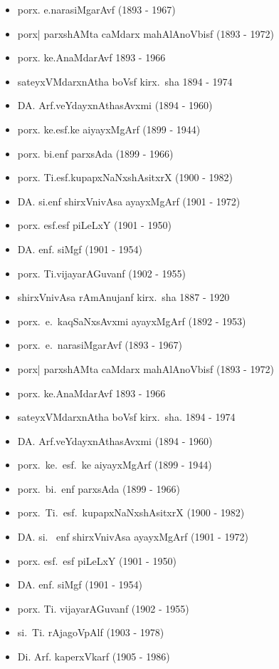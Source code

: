 {\begin{itemize}
\item porx. e.narasiMgarAvf {\rm (1893 - 1967)}
\item porx| parxshAMta caMdarx mahAlAnoVbisf {\rm (1893 - 1972)}
\item porx. ke.AnaMdarAvf {\rm 1893 - 1966}
\item sateyxVMdarxnAtha boVsf kirx.~sha {\rm 1894 - 1974}
\item DA. Arf.veYdayxnAthasAvxmi {\rm (1894 - 1960)}
\item porx. ke.esf.ke aiyayxMgArf {\rm (1899 - 1944)}
\item porx. bi.enf parxsAda {\rm (1899 - 1966)}
\item porx. Ti.esf.kupapxNaNxshAsitxrX {\rm (1900 - 1982)}
\item DA. si.enf shirxVnivAsa ayayxMgArf {\rm (1901 - 1972)}
\item porx. esf.esf piLeLxY {\rm (1901 - 1950)}
\item DA. enf. siMgf {\rm (1901 - 1954)}
\item porx. Ti.vijayarAGuvanf {\rm (1902 - 1955)}
\item shirxVnivAsa rAmAnujanf kirx.~sha {\rm 1887 - 1920}
\item porx.~e.~kaqSaNxsAvxmi ayayxMgArf {\rm (1892 - 1953)}
\item porx.~e.~narasiMgarAvf {\rm (1893 - 1967)}
\item porx| parxshAMta caMdarx mahAlAnoVbisf {\rm (1893 - 1972)}
\item porx. ke.AnaMdarAvf {\rm 1893 - 1966}
\item sateyxVMdarxnAtha boVsf kirx.~sha. {\rm 1894 - 1974}
\item DA. Arf.veYdayxnAthasAvxmi {\rm (1894 - 1960)}
\item porx.~ke.~esf.~ke aiyayxMgArf {\rm (1899 - 1944)}
\item porx.~bi.~enf parxsAda {\rm (1899 - 1966)}
\item porx.~Ti.~esf.~kupapxNaNxshAsitxrX {\rm (1900 - 1982)}
\item DA. si.~ enf shirxVnivAsa ayayxMgArf {\rm (1901 - 1972)}
\item porx. esf.~esf piLeLxY {\rm (1901 - 1950)}
\item DA. enf. siMgf {\rm (1901 - 1954)}
\item porx. Ti. vijayarAGuvanf {\rm (1902 - 1955)}
\item si.~Ti. rAjagoVpAlf {\rm (1903 - 1978)}
\item Di. Arf. kaperxVkarf {\rm (1905 - 1986)}

\end{itemize}}
